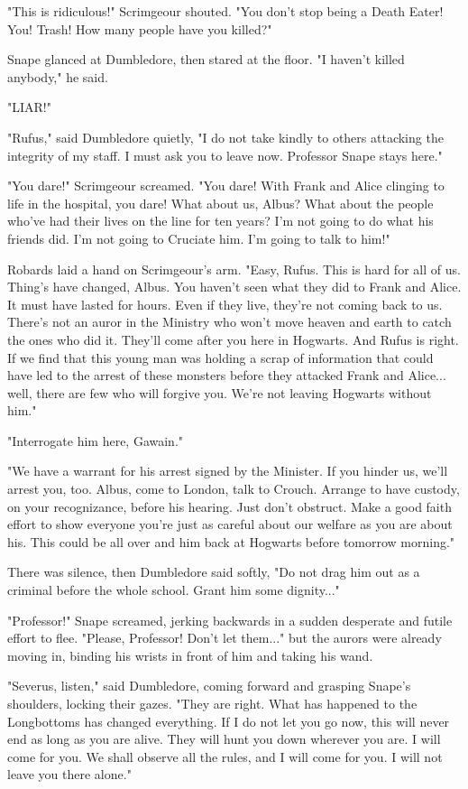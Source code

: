 "This is ridiculous!" Scrimgeour shouted. "You don't stop being a Death Eater! You! Trash! How many people have you killed?"

Snape glanced at Dumbledore, then stared at the floor. "I haven't killed anybody," he said.

"LIAR!"

"Rufus," said Dumbledore quietly, "I do not take kindly to others attacking the integrity of my staff. I must ask you to leave now. Professor Snape stays here."

"You dare!" Scrimgeour screamed. "You dare! With Frank and Alice clinging to life in the hospital, you dare! What about us, Albus? What about the people who've had their lives on the line for ten years? I'm not going to do what his friends did. I'm not going to Cruciate him. I'm going to talk to him!"

Robards laid a hand on Scrimgeour's arm. "Easy, Rufus. This is hard for all of us. Thing's have changed, Albus. You haven't seen what they did to Frank and Alice. It must have lasted for hours. Even if they live, they're not coming back to us. There's not an auror in the Ministry who won't move heaven and earth to catch the ones who did it. They'll come after you here in Hogwarts. And Rufus is right. If we find that this young man was holding a scrap of information that could have led to the arrest of these monsters before they attacked Frank and Alice... well, there are few who will forgive you. We're not leaving Hogwarts without him."

"Interrogate him here, Gawain."

"We have a warrant for his arrest signed by the Minister. If you hinder us, we'll arrest you, too. Albus, come to London, talk to Crouch. Arrange to have custody, on your recognizance, before his hearing. Just don't obstruct. Make a good faith effort to show everyone you're just as careful about our welfare as you are about his. This could be all over and him back at Hogwarts before tomorrow morning."

There was silence, then Dumbledore said softly, "Do not drag him out as a criminal before the whole school. Grant him some dignity..."

"Professor!" Snape screamed, jerking backwards in a sudden desperate and futile effort to flee. "Please, Professor! Don't let them..." but the aurors were already moving in, binding his wrists in front of him and taking his wand.

"Severus, listen," said Dumbledore, coming forward and grasping Snape's shoulders, locking their gazes. "They are right. What has happened to the Longbottoms has changed everything. If I do not let you go now, this will never end as long as you are alive. They will hunt you down wherever you are. I will come for you. We shall observe all the rules, and I will come for you. I will not leave you there alone."

